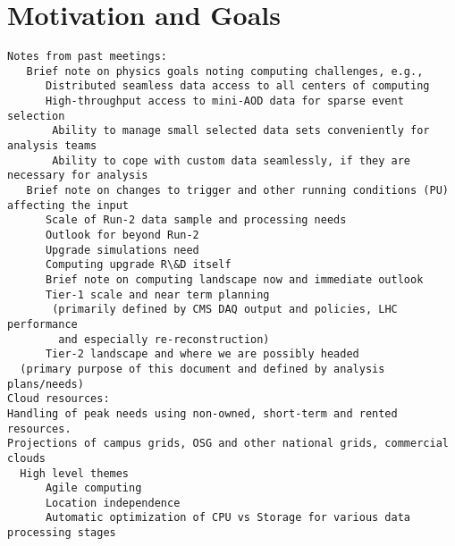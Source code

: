 \section{Motivation and Goals}

\begin{verbatim}
Notes from past meetings:
   Brief note on physics goals noting computing challenges, e.g.,
      Distributed seamless data access to all centers of computing
      High-throughput access to mini-AOD data for sparse event selection
       Ability to manage small selected data sets conveniently for analysis teams
       Ability to cope with custom data seamlessly, if they are necessary for analysis
   Brief note on changes to trigger and other running conditions (PU) affecting the input
      Scale of Run-2 data sample and processing needs
      Outlook for beyond Run-2
      Upgrade simulations need
      Computing upgrade R\&D itself
      Brief note on computing landscape now and immediate outlook
      Tier-1 scale and near term planning
       (primarily defined by CMS DAQ output and policies, LHC performance 
        and especially re-reconstruction)
      Tier-2 landscape and where we are possibly headed 
  (primary purpose of this document and defined by analysis plans/needs)
Cloud resources: 
Handling of peak needs using non-owned, short-term and rented resources.
Projections of campus grids, OSG and other national grids, commercial clouds 
  High level themes
      Agile computing
      Location independence
      Automatic optimization of CPU vs Storage for various data processing stages
\end{verbatim}

